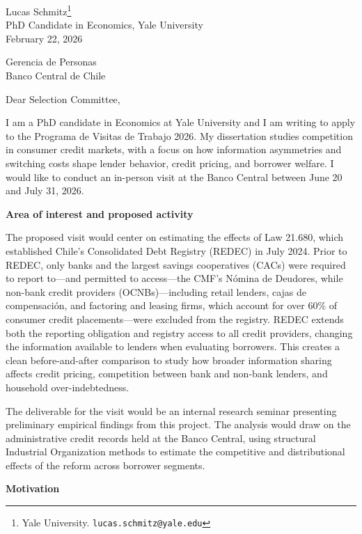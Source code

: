 \documentclass[12pt]{article}
\begin{document}
\noindent Lucas Schmitz\footnote{Yale University. \texttt{lucas.schmitz@yale.edu}}\\
PhD Candidate in Economics, Yale University\\
February 22, 2026

\bigskip

\noindent Gerencia de Personas\\
Banco Central de Chile

\bigskip

\noindent Dear Selection Committee,

I am a PhD candidate in Economics at Yale University and I am writing to apply to the Programa de Visitas de Trabajo 2026. My dissertation studies competition in consumer credit markets, with a focus on how information asymmetries and switching costs shape lender behavior, credit pricing, and borrower welfare. I would like to conduct an in-person visit at the Banco Central between June 20 and July 31, 2026.

\noindent\textbf{Area of interest and proposed activity}

The proposed visit would center on estimating the effects of Law 21.680, which established Chile's Consolidated Debt Registry (REDEC) in July 2024. Prior to REDEC, only banks and the largest savings cooperatives (CACs) were required to report to---and permitted to access---the CMF's N\'{o}mina de Deudores, while non-bank credit providers (OCNBs)---including retail lenders, cajas de compensaci\'{o}n, and factoring and leasing firms, which account for over 60\% of consumer credit placements---were excluded from the registry. REDEC extends both the reporting obligation and registry access to all credit providers, changing the information available to lenders when evaluating borrowers. This creates a clean before-and-after comparison to study how broader information sharing affects credit pricing, competition between bank and non-bank lenders, and household over-indebtedness.

The deliverable for the visit would be an internal research seminar presenting preliminary empirical findings from this project. The analysis would draw on the administrative credit records held at the Banco Central, using structural Industrial Organization methods to estimate the competitive and distributional effects of the reform across borrower segments.

\noindent\textbf{Motivation}
\end{document}
